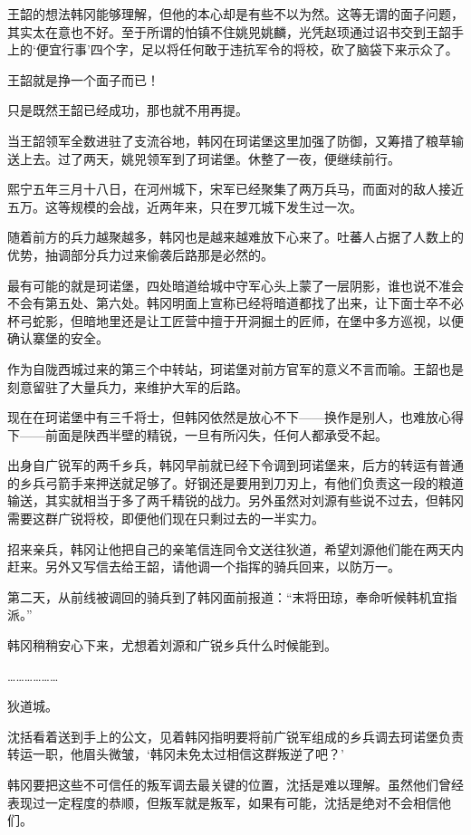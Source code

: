 王韶的想法韩冈能够理解，但他的本心却是有些不以为然。这等无谓的面子问题，其实太在意也不好。至于所谓的怕镇不住姚兕姚麟，光凭赵顼通过诏书交到王韶手上的‘便宜行事’四个字，足以将任何敢于违抗军令的将校，砍了脑袋下来示众了。

王韶就是挣一个面子而已！

只是既然王韶已经成功，那也就不用再提。

当王韶领军全数进驻了支流谷地，韩冈在珂诺堡这里加强了防御，又筹措了粮草输送上去。过了两天，姚兕领军到了珂诺堡。休整了一夜，便继续前行。

熙宁五年三月十八日，在河州城下，宋军已经聚集了两万兵马，而面对的敌人接近五万。这等规模的会战，近两年来，只在罗兀城下发生过一次。

随着前方的兵力越聚越多，韩冈也是越来越难放下心来了。吐蕃人占据了人数上的优势，抽调部分兵力过来偷袭后路那是必然的。

最有可能的就是珂诺堡，四处暗道给城中守军心头上蒙了一层阴影，谁也说不准会不会有第五处、第六处。韩冈明面上宣称已经将暗道都找了出来，让下面士卒不必杯弓蛇影，但暗地里还是让工匠营中擅于开洞掘土的匠师，在堡中多方巡视，以便确认寨堡的安全。

作为自陇西城过来的第三个中转站，珂诺堡对前方官军的意义不言而喻。王韶也是刻意留驻了大量兵力，来维护大军的后路。

现在在珂诺堡中有三千将士，但韩冈依然是放心不下——换作是别人，也难放心得下——前面是陕西半壁的精锐，一旦有所闪失，任何人都承受不起。

出身自广锐军的两千乡兵，韩冈早前就已经下令调到珂诺堡来，后方的转运有普通的乡兵弓箭手来押送就足够了。好钢还是要用到刀刃上，有他们负责这一段的粮道输送，其实就相当于多了两千精锐的战力。另外虽然对刘源有些说不过去，但韩冈需要这群广锐将校，即便他们现在只剩过去的一半实力。

招来亲兵，韩冈让他把自己的亲笔信连同令文送往狄道，希望刘源他们能在两天内赶来。另外又写信去给王韶，请他调一个指挥的骑兵回来，以防万一。

第二天，从前线被调回的骑兵到了韩冈面前报道：“末将田琼，奉命听候韩机宜指派。”

韩冈稍稍安心下来，尤想着刘源和广锐乡兵什么时候能到。

………………

狄道城。

沈括看着送到手上的公文，见着韩冈指明要将前广锐军组成的乡兵调去珂诺堡负责转运一职，他眉头微皱，‘韩冈未免太过相信这群叛逆了吧？’

韩冈要把这些不可信任的叛军调去最关键的位置，沈括是难以理解。虽然他们曾经表现过一定程度的恭顺，但叛军就是叛军，如果有可能，沈括是绝对不会相信他们。

